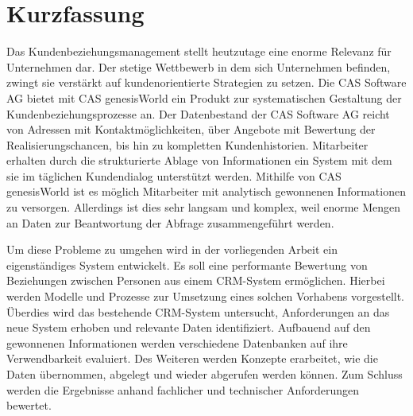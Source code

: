 
\chapter*{\centering Kurzfassung}



Das Kundenbeziehungsmanagement stellt heutzutage eine enorme Relevanz für Unternehmen dar. Der stetige Wettbewerb in dem sich Unternehmen
befinden, zwingt sie verstärkt auf kundenorientierte Strategien zu setzen. Die CAS Software AG bietet mit CAS genesisWorld ein Produkt zur systematischen Gestaltung der Kundenbeziehungsprozesse an. Der Datenbestand der CAS Software AG reicht von Adressen mit Kontaktmöglichkeiten, über Angebote mit Bewertung der Realisierungschancen, bis hin zu kompletten Kundenhistorien. Mitarbeiter erhalten durch die strukturierte Ablage von Informationen ein System mit dem sie im täglichen Kundendialog unterstützt werden. Mithilfe von CAS genesisWorld ist es möglich Mitarbeiter mit analytisch gewonnenen Informationen zu versorgen. Allerdings ist dies sehr langsam und komplex, weil enorme Mengen an Daten zur Beantwortung der Abfrage zusammengeführt werden.       

Um diese Probleme zu umgehen wird in der vorliegenden Arbeit ein eigenständiges System entwickelt. Es soll eine performante Bewertung von Beziehungen zwischen Personen aus einem CRM-System ermöglichen. Hierbei werden Modelle und Prozesse zur Umsetzung eines solchen Vorhabens vorgestellt. Überdies wird das bestehende CRM-System untersucht, Anforderungen an das neue System erhoben und relevante Daten identifiziert. Aufbauend auf den gewonnenen Informationen werden verschiedene Datenbanken auf ihre Verwendbarkeit evaluiert. Des Weiteren werden Konzepte erarbeitet, wie die Daten übernommen, abgelegt und wieder abgerufen werden können. Zum Schluss werden die Ergebnisse anhand fachlicher und technischer Anforderungen bewertet.